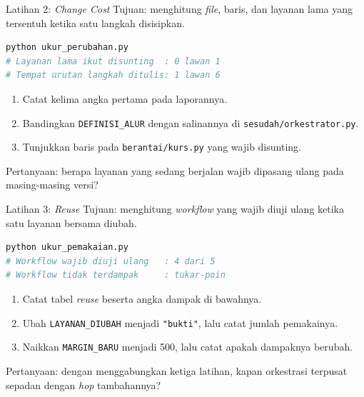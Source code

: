 \documentclass[aspectratio=169, table, 12pt]{beamer}
\begin{document}
\begin{frame}[fragile]{{\Large Latihan 2: \textit{Change Cost}}}
  \vspace{8pt}
  {\small Tujuan: menghitung \textit{file}, baris, dan layanan lama yang
  tersentuh ketika satu langkah disisipkan.}
  \vspace{2pt}
\begin{lstlisting}[language=bash]
python ukur_perubahan.py
# Layanan lama ikut disunting  : 0 lawan 1
# Tempat urutan langkah ditulis: 1 lawan 6
\end{lstlisting}
  \begin{enumerate}\small
    \item Catat kelima angka pertama pada laporannya.
    \item Bandingkan \texttt{DEFINISI\_ALUR} dengan salinannya di
          \texttt{sesudah/orkestrator.py}.
    \item Tunjukkan baris pada \texttt{berantai/kurs.py} yang wajib disunting.
  \end{enumerate}
  {\small Pertanyaan: berapa layanan yang sedang berjalan wajib dipasang ulang
  pada masing-masing versi?}
\end{frame}

\begin{frame}[fragile]{{\Large Latihan 3: \textit{Reuse}}}
  \vspace{8pt}
  {\small Tujuan: menghitung \textit{workflow} yang wajib diuji ulang ketika
  satu layanan bersama diubah.}
  \vspace{2pt}
\begin{lstlisting}[language=bash]
python ukur_pemakaian.py
# Workflow wajib diuji ulang   : 4 dari 5
# Workflow tidak terdampak     : tukar-poin
\end{lstlisting}
  \begin{enumerate}\small
    \item Catat tabel \textit{reuse} beserta angka dampak di bawahnya.
    \item Ubah \texttt{LAYANAN\_DIUBAH} menjadi \texttt{"bukti"}, lalu catat
          jumlah pemakainya.
    \item Naikkan \texttt{MARGIN\_BARU} menjadi 500, lalu catat apakah dampaknya
          berubah.
  \end{enumerate}
  {\small Pertanyaan: dengan menggabungkan ketiga latihan, kapan orkestrasi
  terpusat sepadan dengan \textit{hop} tambahannya?}
\end{frame}
\end{document}
